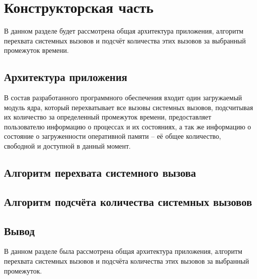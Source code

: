 \chapter{Конструкторская часть}

В данном разделе будет рассмотрена общая архитектура приложения, алгоритм перехвата системных вызовов и подсчёт количества этих вызовов за выбранный промежуток времени.

\section{Архитектура приложения}

В состав разработанного программного обеспечения входит один загружаемый модуль ядра, который перехватывает все вызовы системных вызовов, подсчитывая их количество за определенный промежуток времени, предоставляет пользователю информацию о процессах и их состояниях, а так же информацию о состояние о загруженности оперативной памяти -- её общее количество, свободной и доступной в данный момент.

\section{Алгоритм перехвата системного вызова}

\section{Алгоритм подсчёта количества системных вызовов}

\section*{Вывод}

В данном разделе была рассмотрена общая архитектура приложения, алгоритм перехвата системных вызовов и подсчёта количества этих вызовов за выбранный промежуток.



